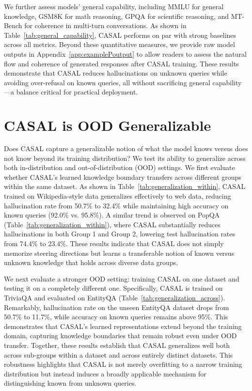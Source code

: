 \documentclass{article} %
\begin{document}
We further assess models' general capability, including MMLU \citep{mmlu} for general knowledge, GSM8K \citep{gsm8k} for math reasoning, GPQA\citep{gpqa} for scientific reasoning, and MT-Bench \citep{mtbench} for coherence in multi-turn conversations. As shown in Table~\ref{tab:general_capability}, CASAL performs on par with strong baselines across all metrics. Beyond these quantitative measures, we provide raw model outputs in Appendix~\ref{app:examplePoutput} to allow readers to assess the natural flow and coherence of generated responses after CASAL training.
These results demonstrate that CASAL reduces hallucinations on unknown queries while avoiding over-refusal on known queries, all without sacrificing general capability—a balance critical for practical deployment.

\section{CASAL is OOD Generalizable}

Does CASAL capture a generalizable notion of what the model knows versus does not know beyond its training distribution? We test its ability to generalize across both in-distribution and out-of-distribution (OOD) settings. We first evaluate whether CASAL's learned knowledge boundary transfers across different groups within the same dataset. As shown in Table~\ref{tab:generalization_within}, CASAL trained on Wikipedia-style data generalizes effectively to web data, reducing hallucination rate from 50.7\% to 32.4\% while maintaining high accuracy on known queries (92.0\% vs. 95.8\%). A similar trend is observed on PopQA (Table~\ref{tab:generalization_within}), where CASAL substantially reduces hallucinations in both Group 1 and Group 2, lowering test hallucination rates from 74.4\% to 23.4\%. These results indicate that CASAL does not simply memorize steering directions but learns a transferable notion of known versus unknown knowledge that holds across diverse data groups. 

We next evaluate a stronger OOD setting: training CASAL on one dataset and testing it on a completely different one. Specifically, CASAL is trained on TriviaQA and evaluated on EntityQA (Table~\ref{tab:generalization_across}). Remarkably, hallucination rate on the unseen EntityQA dataset drops from 50.7\% to 11.7\%, while accuracy on known queries remains above 95\%. This demonstrates that CASAL's learned representations extend beyond the training domain, capturing knowledge boundaries that remain robust even under OOD transfer. Together, these results establish that CASAL generalizes well both across sub-groups within a dataset and across entirely distinct datasets. This robustness highlights that CASAL is not merely overfitting to a narrow training distribution but instead induces a broadly applicable mechanism for distinguishing known from unknown queries.
\end{document}
